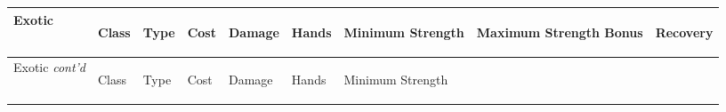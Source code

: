 \documentclass[twoside]{book}
\begin{document}
\begin{longtable}{p{1.25in}llllp{2em}p{3em}p{3em}l} 
  Exotic
  &
  \begin{turn}{70}{Class}\end{turn}
          
  &
  \begin{turn}{70}{Type}\end{turn}
          
  &
  \begin{turn}{70}{Cost}\end{turn}
          
  &
  \begin{turn}{70}{Damage}\end{turn}
          
  &
  \begin{turn}{70}{Hands}\end{turn}
          
  &
  \begin{turn}{70}{Minimum Strength}\end{turn}
          
  &
  \begin{turn}{70}{Maximum Strength Bonus}\end{turn}
          
  &
  \begin{turn}{70}{Recovery}\end{turn}
          
  \\
  \hline
  \hline
  \endfirsthead
  Exotic \textit{cont'd}
        
  &
  \begin{turn}{70}{Class}\end{turn}
          
  &
  \begin{turn}{70}{Type}\end{turn}
          
  &
  \begin{turn}{70}{Cost}\end{turn}
          
  &
  \begin{turn}{70}{Damage}\end{turn}
          
  &
  \begin{turn}{70}{Hands}\end{turn}
          
  &
  \begin{turn}{70}{Minimum Strength}\end{turn}
          

\end{longtable}
\end{document}

